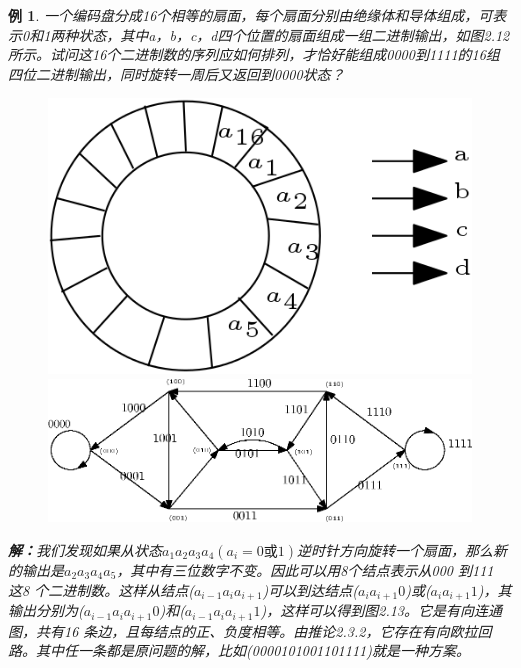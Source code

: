 \documentclass[11pt,a4paper,openany]{book}
\newtheorem{sample}{\textbf{例}}[section]
\begin{document}
\begin{sample}
一个编码盘分成16个相等的扇面，每个扇面分别由绝缘体和导体组成，可表示0和1两种状态，其中a，b，c，d四个位置的扇面组成一组二进制输出，如图2.12所示。试问这16个二进制数的序列应如何排列，才恰好能组成0000到1111的16组四位二进制输出，同时旋转一周后又返回到0000状态？\\
\begin{figure}[h]
  \centering
  \vspace{-10pt}
  \begin{minipage}[!ht]{.35\linewidth}
  \includegraphics[width=1.0\linewidth]{2.11.png}
  \caption{}
  \end{minipage}
  \begin{minipage}[!ht]{.6\linewidth}
   \includegraphics[width=1.0\linewidth]{2_12.eps}
  \caption{}
  \end{minipage}
  \vspace{-20pt}
\end{figure}
\textbf{解：}我们发现如果从状态$a_1 a_2 a_3 a_4 (a_i=0或1)$逆时针方向旋转一个扇面，那么新的输出是$a_2 a_3 a_4 a_5$，其中有三位数字不变。因此可以用8个结点表示从000 到111 这8 个二进制数。这样从结点($a_{i-1} a_i a_{i+1}$)可以到达结点($a_i a_{i+1} 0$)或($a_i a_{i+1} 1$)，其输出分别为($a_{i-1} a_i a_{i+1} 0$)和($a_{i-1} a_i a_{i+1} 1$)，这样可以得到图2.13。它是有向连通图，共有16 条边，且每结点的正、负度相等。由推论2.3.2，它存在有向欧拉回路。其中任一条都是原问题的解，比如(0000101001101111)就是一种方案。\\
\end{sample}
\end{document}
